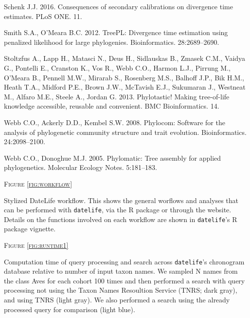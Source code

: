 \documentclass[]{article}
\begin{document}
\leavevmode\hypertarget{ref-Schenk2016}{}%
Schenk J.J. 2016. Consequences of secondary calibrations on divergence time estimates. PLoS ONE. 11.

\leavevmode\hypertarget{ref-Smith2012}{}%
Smith S.A., O'Meara B.C. 2012. TreePL: Divergence time estimation using penalized likelihood for large phylogenies. Bioinformatics. 28:2689--2690.

\leavevmode\hypertarget{ref-Stoltzfus2013}{}%
Stoltzfus A., Lapp H., Matasci N., Deus H., Sidlauskas B., Zmasek C.M., Vaidya G., Pontelli E., Cranston K., Vos R., Webb C.O., Harmon L.J., Pirrung M., O'Meara B., Pennell M.W., Mirarab S., Rosenberg M.S., Balhoff J.P., Bik H.M., Heath T.A., Midford P.E., Brown J.W., McTavish E.J., Sukumaran J., Westneat M., Alfaro M.E., Steele A., Jordan G. 2013. Phylotastic! Making tree-of-life knowledge accessible, reusable and convenient. BMC Bioinformatics. 14.

\leavevmode\hypertarget{ref-Webb2008}{}%
Webb C.O., Ackerly D.D., Kembel S.W. 2008. Phylocom: Software for the analysis of phylogenetic community structure and trait evolution. Bioinformatics. 24:2098--2100.

\leavevmode\hypertarget{ref-webb2005phylomatic}{}%
Webb C.O., Donoghue M.J. 2005. Phylomatic: Tree assembly for applied phylogenetics. Molecular Ecology Notes. 5:181--183.

\newpage

\begin{center}
\textsc{Figure \ref{fig:workflow}}
\end{center}
Stylized DateLife workflow. This shows the general worflows and analyses that can be performed with \texttt{datelife}, via the R package or through the website. Details on the functions involved on each workflow are shown in \texttt{datelife}'s R package vignette.

\begin{center}
\textsc{Figure \ref{fig:runtime1}}
\end{center}
Computation time of query processing and search across \texttt{datelife}'s chronogram database relative to number of input taxon names. We sampled N names from the class Aves for each cohort 100 times and then performed a search with query processing not using the Taxon Names Resoultion Service (TNRS; dark gray), and using TNRS (light gray). We also performed a search using the already processed query for comparison (light blue). 
\end{document}
